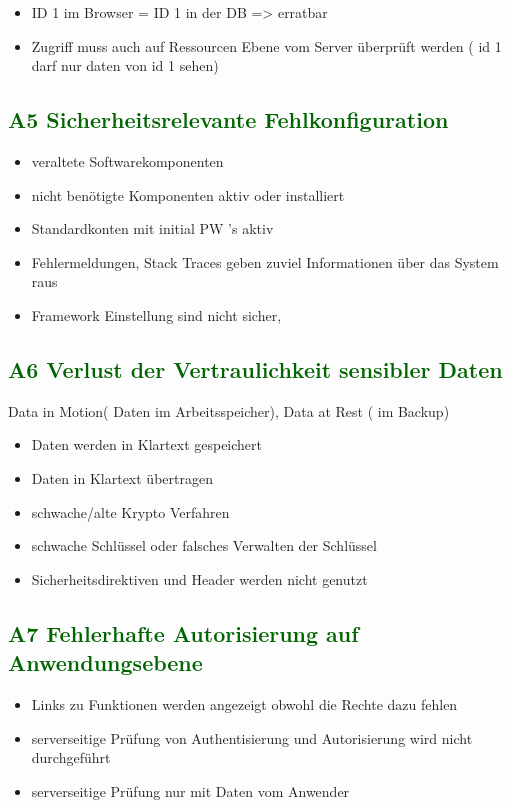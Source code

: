 	\begin{itemize}
	\item ID 1 im Browser = ID 1 in der DB => erratbar
	\item Zugriff muss auch auf Ressourcen Ebene vom Server überprüft werden ( id 1 darf nur daten von id 1 sehen)
	\end{itemize}



\subsection*{\textcolor{darkgreen}{A5 Sicherheitsrelevante Fehlkonfiguration}}

	\begin{itemize}
	\item veraltete Softwarekomponenten
	\item nicht benötigte Komponenten aktiv oder installiert
	\item Standardkonten mit initial PW\'{ '}s aktiv 
	\item Fehlermeldungen, Stack Traces geben zuviel Informationen über das System raus
	\item Framework Einstellung sind nicht sicher,
	\end{itemize}

\subsection*{\textcolor{darkgreen}{A6 Verlust der Vertraulichkeit sensibler Daten}}
Data in Motion( Daten im Arbeitsspeicher), Data at Rest ( im Backup) 
	\begin{itemize}
	\item Daten werden in Klartext gespeichert
	\item Daten in Klartext übertragen
	\item schwache/alte Krypto Verfahren
	\item schwache Schlüssel oder falsches Verwalten der Schlüssel
	\item Sicherheitsdirektiven und Header werden nicht genutzt
	\end{itemize}

\subsection*{\textcolor{darkgreen}{A7 Fehlerhafte Autorisierung auf Anwendungsebene}}
\begin{itemize}
	\item Links zu Funktionen werden angezeigt obwohl die Rechte dazu fehlen
	\item serverseitige Prüfung von Authentisierung und Autorisierung wird nicht durchgeführt
	\item serverseitige Prüfung nur mit Daten vom Anwender
\end{itemize}

